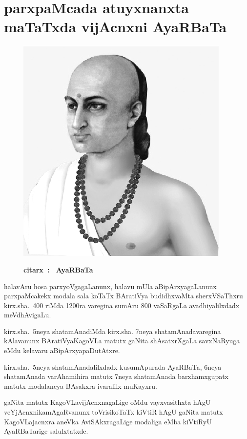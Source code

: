 \chapter{parxpaMcada atuyxnanxta maTaTxda vijAcnxni AyaRBaTa}%

\begin{figure}
  \centering\includegraphics[scale=0.8]{src/figures/aryabhata.eps}
  
  {\bf citarx~: ~AyaRBaTa}
    \end{figure}


halavAru hosa parxyoVgagaLanunx, halavu mUla aBipArxyagaLanunx parxpaMcakekx modala sala koTaTx BAratiVya budidhxvaMta sherxVSaThxru kirx.sha.~{\rm 400} riMda {\rm 1200}ra varegina sumAru {\rm 800} vaSaRgaLa avadhiyalilxdadx meVdhAvigaLu.

kirx.sha.~{\rm 5}neya shatamAnadiMda kirx.sha. {\rm 7}neya shatamAnadavaregina kAlavanunx BAratiVya\break KagoVLa matutx gaNita shAsatxrXgaLa savxNaRyuga eMdu kelavaru aBipArxyapaDutAtxre.

kirx.sha.~{\rm 5}neya shatamAnadalilxdadx kusumApurada AyaRBaTa, {\rm 6}neya shatamAnada varAhamihira matutx {\rm 7}neya shatamAnada barxhamxgupatx matutx modalaneya BAsakxra ivaralilx muKayxru.

gaNita matutx KagoVLavijAcnxnagaLige oMdu vayxvasithxta hAgU veYjAcnxnikamAgaRvanunx toVrisikoTaTx kiVtiR hAgU gaNita matutx KagoVLajacnxra aneVka AviSAkxragaLige modaliga eMba kiVtiRyU AyaRBaTarige salulxtatxde.

